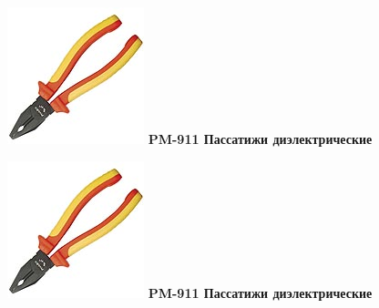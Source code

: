 \documentclass{magazine}
\begin{document}
\begin{multicols}{2}
\noindent\includegraphics[width=\columnwidth]{fig/00/pros/PM-911.jpg}
\textbf{PM-911 Пассатижи диэлектрические}

\noindent\includegraphics[width=\columnwidth]{fig/00/pros/PM-911.jpg}
\textbf{PM-911 Пассатижи диэлектрические}


\end{multicols}
\end{document}
